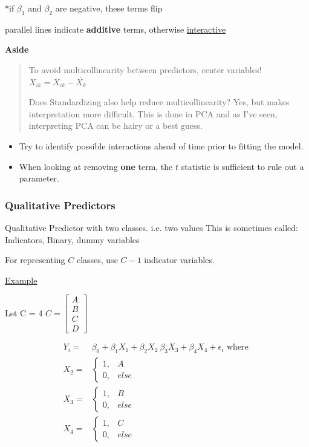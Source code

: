 \documentclass[11pt]{article}
\begin{document}
*if \(\beta_1\) and \(\beta_2\) are negative, these terms flip

parallel lines indicate \textbf{additive} terms, otherwise \uline{interactive}

\textbf{Aside}
\begin{quote}
To avoid multicollinearity between predictors, center variables!
 \(X_{ik} = X_{ik} - \bar{X_k}\)

Does Standardizing also help reduce multicollinearity? Yes, but makes
interpretation more difficult. This is done in PCA and as I've seen,
interpreting PCA can be hairy or a best guess.
\end{quote}


\begin{itemize}
\item Try to identify possible interactions ahead of time prior to fitting the
model.
\item When looking at removing \textbf{one} term, the \(t\) statistic is sufficient to rule
out a parameter.
\end{itemize}

\subsubsection{Qualitative Predictors}
\label{sec:org8a33203}
Qualitative Predictor with two classes. i.e. two values
This is sometimes called: Indicators, Binary, dummy variables

For representing \(C\) classes, use \(C - 1\) indicator variables.

\uline{Example}

Let C = 4
\(C =\begin{bmatrix}
A\\
B\\
C\\
D
\end{bmatrix}\)

\begin{equation}
\begin{split}
Y_i = & \beta_0 + \beta_1 X_1 + \beta_2 X_2 \ \beta_3 X_3 + \beta_4 X_4 + \epsilon_i \text{ where }\\
X_2 = & \begin{cases}
1, &  A\\
0, & else
\end{cases}\\
X_3 = & \begin{cases}
1, &  B\\
0, & else
\end{cases}\\
X_4 = & \begin{cases}
1, &  C\\
0, & else
\end{cases}
\end{split}
\end{equation}
\end{document}

